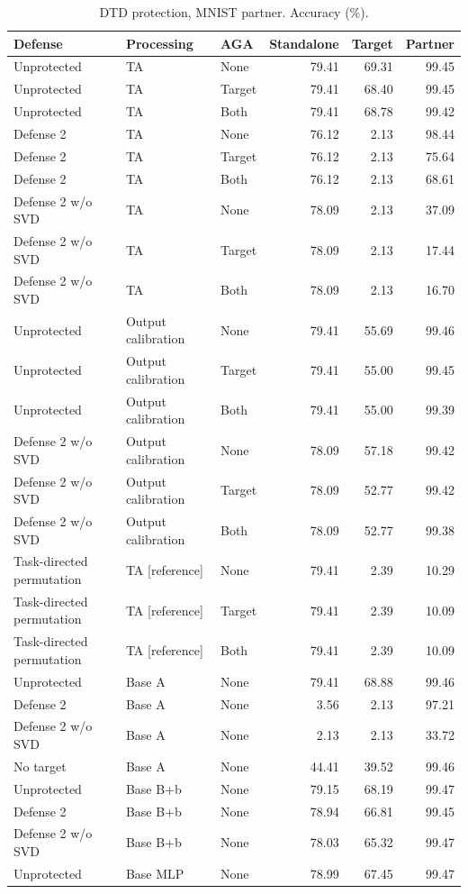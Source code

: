 \begin{table}[t]
\centering\small
\caption{DTD protection, MNIST partner. Accuracy (\%).}
\begin{tabular}{lllrrr}
\toprule
Defense & Processing & AGA & Standalone & Target & Partner \\
\midrule
Unprotected & TA & None & 79.41 & 69.31 & 99.45 \\
Unprotected & TA & Target & 79.41 & 68.40 & 99.45 \\
Unprotected & TA & Both & 79.41 & 68.78 & 99.42 \\
Defense 2 & TA & None & 76.12 & 2.13 & 98.44 \\
Defense 2 & TA & Target & 76.12 & 2.13 & 75.64 \\
Defense 2 & TA & Both & 76.12 & 2.13 & 68.61 \\
Defense 2 w/o SVD & TA & None & 78.09 & 2.13 & 37.09 \\
Defense 2 w/o SVD & TA & Target & 78.09 & 2.13 & 17.44 \\
Defense 2 w/o SVD & TA & Both & 78.09 & 2.13 & 16.70 \\
Unprotected & Output calibration & None & 79.41 & 55.69 & 99.46 \\
Unprotected & Output calibration & Target & 79.41 & 55.00 & 99.45 \\
Unprotected & Output calibration & Both & 79.41 & 55.00 & 99.39 \\
Defense 2 w/o SVD & Output calibration & None & 78.09 & 57.18 & 99.42 \\
Defense 2 w/o SVD & Output calibration & Target & 78.09 & 52.77 & 99.42 \\
Defense 2 w/o SVD & Output calibration & Both & 78.09 & 52.77 & 99.38 \\
Task-directed permutation & TA [reference] & None & 79.41 & 2.39 & 10.29 \\
Task-directed permutation & TA [reference] & Target & 79.41 & 2.39 & 10.09 \\
Task-directed permutation & TA [reference] & Both & 79.41 & 2.39 & 10.09 \\
Unprotected & Base A & None & 79.41 & 68.88 & 99.46 \\
Defense 2 & Base A & None & 3.56 & 2.13 & 97.21 \\
Defense 2 w/o SVD & Base A & None & 2.13 & 2.13 & 33.72 \\
No target & Base A & None & 44.41 & 39.52 & 99.46 \\
Unprotected & Base B+b & None & 79.15 & 68.19 & 99.47 \\
Defense 2 & Base B+b & None & 78.94 & 66.81 & 99.45 \\
Defense 2 w/o SVD & Base B+b & None & 78.03 & 65.32 & 99.47 \\
Unprotected & Base MLP & None & 78.99 & 67.45 & 99.47 \\
\bottomrule
\end{tabular}
\end{table}

